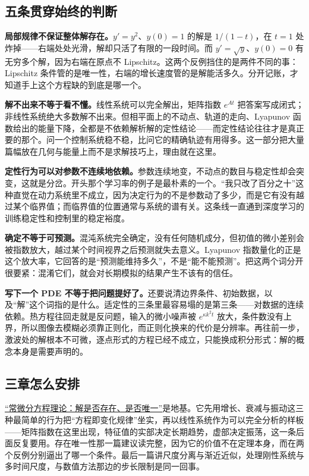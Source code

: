 \subsection{五条贯穿始终的判断}

\textbf{局部规律不保证整体解存在。}\(y' = y^2\)、\(y(0)=1\) 的解是 \(1/(1-t)\)，在 \(t=1\) 处炸掉——右端处处光滑，解却只活了有限的一段时间。而 \(y' = \sqrt{y}\)、\(y(0)=0\) 有无穷多个解，因为右端在原点不 Lipschitz。这两个反例挡住的是两件不同的事：Lipschitz 条件管的是唯一性，右端的增长速度管的是解能活多久。分开记账，才知道手上这个方程缺的到底是哪一个。

\textbf{解不出来不等于看不懂。}线性系统可以完全解出，矩阵指数 \(e^{At}\) 把答案写成闭式；非线性系统绝大多数解不出来。但相平面上的不动点、轨道的走向、Lyapunov 函数给出的能量下降，全都是不依赖解析解的定性结论——而定性结论往往才是真正要的那个。问一个控制系统稳不稳，比问它的精确轨迹有用得多。这一部分把大量篇幅放在几何与能量上而不是求解技巧上，理由就在这里。

\textbf{定性行为可以对参数不连续地依赖。}参数连续地变，不动点的数目与稳定性却会突变，这就是分岔。开头那个学习率的例子是最朴素的一个。``我只改了百分之十''这种直觉在动力系统里不成立，因为决定行为的不是参数动了多少，而是它有没有越过某个临界值；而临界值的位置通常与系统的谱有关。这条线一直通到深度学习的训练稳定性和控制里的稳定裕度。

\textbf{确定不等于可预测。}混沌系统完全确定，没有任何随机成分，但初值的微小差别会被指数放大，越过某个时间视界之后预测就失去意义。Lyapunov 指数量化的正是这个放大率，它回答的是``预测能维持多久''，不是``能不能预测''。把这两个词分开很要紧：混淆它们，就会对长期模拟的结果产生不该有的信任。

\textbf{写下一个 PDE 不等于把问题提好了。}还要说清边界条件、初始数据，以及``解''这个词指的是什么。适定性的三条里最容易塌的是第三条——对数据的连续依赖。热方程往回走就是反问题，输入的微小噪声被 \(e^{\kappa k^2 t}\) 放大，条件数没有上界，所以图像去模糊必须靠正则化，而正则化换来的代价是分辨率。再往前一步，激波处的解根本不可微，逐点形式的方程已经不成立，只能换成积分形式：解的概念本身是需要声明的。

\subsection{三章怎么安排}

\hyperref[ch:134]{``常微分方程理论：解是否存在、是否唯一''}是地基。它先用增长、衰减与振动这三种最简单的行为把``方程即变化规律''坐实，再以线性系统作为可以完全分析的样板——矩阵指数在这里出现，特征值的实部决定长期趋势，虚部决定振荡，这一条后面反复要用。存在唯一性那一篇建议读完整，因为它的价值不在定理本身，而在两个反例分别逼出了哪一个条件。最后一篇讲尺度分离与渐近近似，处理刚性系统与多时间尺度，与数值方法那边的步长限制是同一回事。

